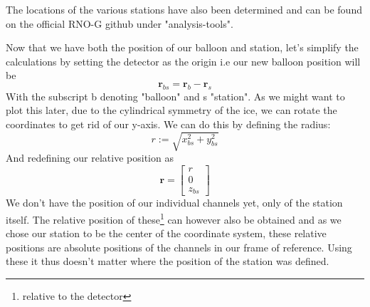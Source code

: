 The locations of the various stations have also been determined and can be found 
on the official RNO-G github under "analysis-tools". 

Now that we have both the position of our balloon and station, 
let's simplify the calculations by setting the detector as the
origin i.e our new balloon position will be
\begin{equation}
  \mathbf{r}_{bs} = \mathbf{r}_b- \mathbf{r}_s
\end{equation}
With the subscript b denoting "balloon" and s "station".
As we might want to plot this later, due to the cylindrical symmetry of the
ice, we can rotate the coordinates to get rid of our y-axis. We can do
this by defining the radius:
\begin{equation}
  r := \sqrt{x_{bs}^2 + y_{bs}^2}
\end{equation}
And redefining our relative position as
\begin{equation}
  \mathbf{r} = 
  \begin{bmatrix}
  r \\
  0 \\
  z_{bs}
  \end{bmatrix}
\end{equation}
We don't have the position of our individual channels yet, only of the station
itself. The relative position of these\footnote{relative to the detector} can
however also be obtained and as we chose our station to be the center of the
coordinate system, these relative positions are absolute positions of the
channels in our frame of reference.  Using these it thus doesn't matter where
the position of the station was defined.

